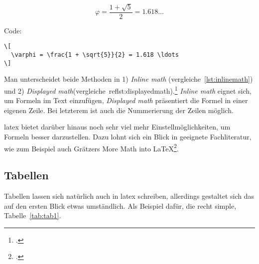 \[
  \varphi = \frac{1 + \sqrt{5}}{2} = 1.618 \ldots
\]

Code:

\begin{lstlisting}[float=htpb,caption=Darstellungen von Mathe mit der \glqq displayed math\grqq-Methode,label=lst:displayermath]
\[
  \varphi = \frac{1 + \sqrt{5}}{2} = 1.618 \ldots
\]
\end{lstlisting}

Man unterscheidet beide Methoden in 1) \emph{Inline math} (vergleiche~\ref{lst:inlinemath}) und 2) \emph{Displayed math}(vergleiche~ref{lst:displayedmath}).\footcite[Vgl. ][S. 276]{kottwitz_latex_2015} \emph{Inline math} eignet sich, um Formeln im Text einzufügen, \emph{Displayed math} präsentiert die Formel in einer eigenen Zeile. Bei letzterem ist auch die Nummerierung der Zeilen möglich.

\gls{latex} bietet darüber hinaus noch sehr viel mehr Einstellmöglichkeiten, um Formeln besser darzustellen. Dazu lohnt sich ein Blick in geeignete Fachliteratur, wie zum Beispiel auch Grätzers \glqq More Math into \LaTeX{}\grqq\footcite{gratzer_more_2016}.
\subsection{Tabellen}%
\label{sec:tables}
Tabellen lassen sich natürlich auch in \gls{latex} schreiben, allerdings gestaltet sich das auf den ersten Blick etwas umständlich. Als Beispiel dafür, die recht simple, Tabelle~\ref{tab:tab1}.
\begin{table}[htbp]
\caption{Eine einfache Tabelle}
\label{tab:tab1}
\end{table}

